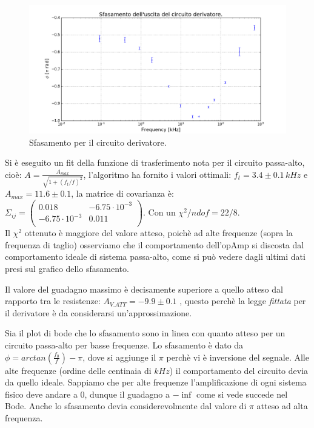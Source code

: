 \documentclass[10pt,a4paper]{article}
\begin{document}
\begin{figure}[!htb]
\centering
   \includegraphics[scale=.6]{derivatoreSfasamento.png}
\caption{Sfasamento per il circuito derivatore.}
\label{sfasamentoDerivatore}
\end{figure}

Si è eseguito un fit della funzione di trasferimento nota per il circuito passa-alto, cioè:
$ A=\frac{A_{max}}{\sqrt{1+(f_t/f)^2}}$, l'algoritmo ha fornito i valori ottimali: $f_t = 3.4 \pm 0.1 \, kHz$ e $A_{max} = 11.6 \pm 0.1$, la matrice di covarianza è: $ \Sigma_{ij} = \left( \begin{array}{cc}
 0.018 & -6.75 \cdot 10^{-3} \\ 
-6.75 \cdot 10^{-3} & 0.011\\
\end{array} \right)$. 
Con un $\chi^2/ndof = 22/8$.\\
Il $\chi^2$ ottenuto è maggiore del valore atteso, poichè ad alte frequenze (sopra la frequenza di taglio) osserviamo che il comportamento dell'opAmp si discosta dal comportamento ideale di sistema passa-alto, come si può vedere dagli ultimi dati presi sul grafico dello sfasamento.

Il valore del guadagno massimo è decisamente superiore a quello atteso dal rapporto tra le resistenze: $A_{V.ATT}= -9.9 \pm 0.1$ , questo perchè la legge \emph{fittata} per il derivatore è da considerarsi un'approssimazione.

Sia il plot di bode che lo sfasamento sono in linea con quanto atteso per un circuito passa-alto per basse frequenze. Lo sfasamento è dato da $\phi = arctan \left( \frac{f_0}{f} \right) - \pi$, dove si aggiunge il $\pi$ perchè vi è inversione del segnale. Alle alte frequenze (ordine delle centinaia di $kHz$) il comportamento del circuito devia da quello ideale. Sappiamo che per alte frequenze l'amplificazione di ogni sistema fisico deve andare a 0, dunque il guadagno a $-\inf$ come si vede succede nel Bode. Anche lo sfasamento devia considerevolmente dal valore di $\pi$ atteso ad alta frequenza.
\end{document}

